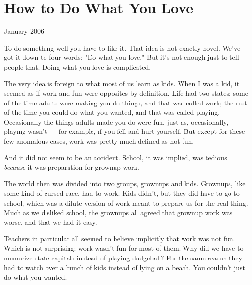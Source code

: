 \chapter{How to Do What You Love}


            
              
                


                  
                    January 2006

To do something well you have to
                    like it. That idea is not exactly novel. We've got it down
                    to four words: "Do what you love." But it's not enough just
                    to tell people that. Doing what you love is complicated.

The
                    very idea is foreign to what most of us learn as kids. When
                    I was a kid, it seemed as if work and fun were opposites by
                    definition. Life had two states: some of the time adults
                    were making you do things, and that was called work; the
                    rest of the time you could do what you wanted, and that was
                    called playing. Occasionally the things adults made you do
                    were fun, just as, occasionally, playing wasn't --- for
                    example, if you fell and hurt yourself. But except for these
                    few anomalous cases, work was pretty much defined as
                    not-fun.

And it did not seem to be an accident.
                    School, it was implied, was tedious \emph{because} it was
                    preparation for grownup work.

The world then was
                    divided into two groups, grownups and kids. Grownups, like
                    some kind of cursed race, had to work. Kids didn't, but they
                    did have to go to school, which was a dilute version of work
                    meant to prepare us for the real thing. Much as we disliked
                    school, the grownups all agreed that grownup work was worse,
                    and that we had it easy.

Teachers in particular
                    all seemed to believe implicitly that work was not fun.
                    Which is not surprising: work wasn't fun for most of them.
                    Why did we have to memorize state capitals instead of
                    playing dodgeball? For the same reason they had to watch
                    over a bunch of kids instead of lying on a beach. You
                    couldn't just do what you wanted.

